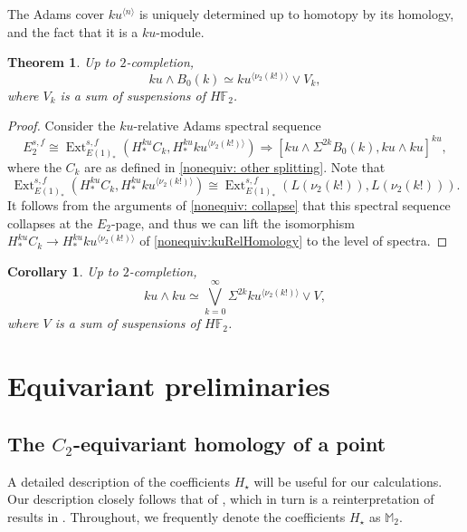 \documentclass{amsart}
\newtheorem{theorem}[equation]{Theorem}
\newtheorem{cor}[equation]{Corollary}
\theoremstyle{plain}
\numberwithin{equation}{section}
\numberwithin{figure}{section}
\DeclareMathOperator{\Ext}{Ext}
\newcommand{\mF}{{\mathbb F}}
\newcommand{\mM}{{\mathbb M}}
\newcommand{\0}{\langle 0 \rangle }
\begin{document}
The Adams cover $ku^{\langle n \rangle}$ is uniquely determined up to homotopy by its homology, and the fact that it is a $ku$-module. 

\begin{theorem} Up to $2$-completion, 
    \[ ku \wedge B_{0}(k) \simeq ku^{\langle \nu_{2}(k!) \rangle} \vee V_{k},\]
    where $V_{k}$ is a sum of suspensions of $H\mF_{2}$.
\end{theorem}

\begin{proof}
Consider the $ku$-relative Adams spectral sequence
\begin{equation}
     E_{2}^{s,f} \cong \Ext_{E(1)_{*}}^{s,f} \left(H_{*}^{ku}C_{k}, H_{*}^{ku}ku^{\langle \nu_{2}(k!) \rangle} \right) \Longrightarrow [ku \wedge \Sigma^{2k}B_{0}(k), ku \wedge ku]^{ku},
\end{equation}
where the $C_k$ are as defined in \cref{nonequiv: other splitting}. 
Note that 
\[
\Ext_{E(1)_*}^{s,f} \left( H_*^{ku} C_k, H_*^{ku} ku^{\langle \nu_2 (k!) \rangle} \right) \cong \Ext_{E(1)_*}^{s,f} \left( L(\nu_2(k!) ), L(\nu_2(k!) ) \right).
\]
It follows from the arguments of \cref{nonequiv: collapse} that this spectral sequence collapses at the $E_{2}$-page, and thus we can lift the isomorphism $H_{*}^{ku}C_{k} \to H_{*}^{ku}ku^{\langle \nu_{2}(k!) \rangle}$ of \cref{nonequiv:kuRelHomology} to the level of spectra.
\end{proof}

\begin{cor} Up to $2$-completion, 
    \[ ku \wedge ku \simeq \bigvee_{k=0}^{\infty} \Sigma^{2k} ku^{\langle \nu_{2}(k!) \rangle} \vee V,  \]
    where $V$ is a sum of suspensions of $H\mF_{2}$.
\end{cor}


\section{Equivariant preliminaries}\label{sec: equivariant preliminaries}

\subsection{The $C_2$-equivariant homology of a point} \label{sec:C2point} A detailed description of the coefficients $H_\star$ will be useful for our calculations. Our description closely follows that of \cite[Section~2.1]{GuillouHillIsaksenRavenel2020}, which in turn is a reinterpretation of results in \cite[Proposition~6.2]{HuKriz2001}. Throughout, we frequently denote  the coefficients $H_\star$ as $\mM_2.$
\end{document}
